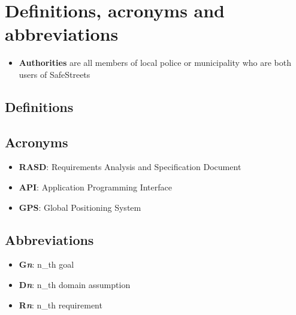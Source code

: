 \section{Definitions, acronyms and abbreviations}
\begin{itemize}
  \item \textbf{Authorities} are all members of local police or municipality who are both users of SafeStreets 
\end{itemize}

\subsection{Definitions}

\subsection{Acronyms}
\begin{itemize}
  \item \textbf{RASD}: Requirements Analysis and Specification Document
  \item \textbf{API}: Application Programming Interface
  \item \textbf{GPS}: Global Positioning System
\end{itemize}

\subsection{Abbreviations}
\begin{itemize}
  \item \textbf{G\textit{n}}: n_{th} goal
  \item \textbf{D\textit{n}}: n_{th} domain assumption
  \item \textbf{R\textit{n}}: n_{th} requirement
\end{itemize}